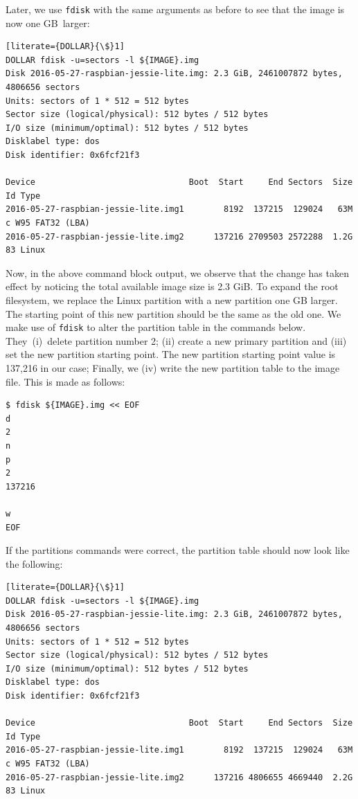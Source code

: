 \documentclass[electronics,article,accept,moreauthors,pdftex,10pt,a4paper]{mdpi}
\theoremstyle{mdpi}
\newcounter{ex}
\newcounter{re}
\theoremstyle{mdpidefinition}
\begin{document}
Later, we use \texttt{fdisk} with the same arguments as before to see that
the image is now one GB~larger:
\begin{lstlisting}[literate={DOLLAR}{\$}1]
DOLLAR fdisk -u=sectors -l ${IMAGE}.img
Disk 2016-05-27-raspbian-jessie-lite.img: 2.3 GiB, 2461007872 bytes, 4806656 sectors
Units: sectors of 1 * 512 = 512 bytes
Sector size (logical/physical): 512 bytes / 512 bytes
I/O size (minimum/optimal): 512 bytes / 512 bytes
Disklabel type: dos
Disk identifier: 0x6fcf21f3

Device                               Boot  Start     End Sectors  Size Id Type
2016-05-27-raspbian-jessie-lite.img1        8192  137215  129024   63M  c W95 FAT32 (LBA)
2016-05-27-raspbian-jessie-lite.img2      137216 2709503 2572288  1.2G 83 Linux
\end{lstlisting}
\FloatBarrier
\vspace{-5mm}

Now, in the above command block output, we observe that the change has taken
effect by noticing the total available image size is 2.3 GiB. To expand the
root filesystem, we replace the Linux partition with a new partition one GB
larger. The starting point of this new partition should be the same as the old
one. We make use of \texttt{fdisk} to alter the partition table
in the commands below. They~(i)~delete partition number 2; (ii) create a new
primary partition and (iii) set the new partition starting point. The new
partition starting point value is 137,216 in our case; Finally, we (iv) write
the new partition table to the image file. This is made as follows:
\newpage
\begin{lstlisting}[]
$ fdisk ${IMAGE}.img << EOF
d
2
n
p
2
137216

w
EOF
\end{lstlisting}
\FloatBarrier
\vspace{-5mm}

If the partitions commands were correct, the partition table should now
look like the following:
\begin{lstlisting}[literate={DOLLAR}{\$}1]
DOLLAR fdisk -u=sectors -l ${IMAGE}.img
Disk 2016-05-27-raspbian-jessie-lite.img: 2.3 GiB, 2461007872 bytes, 4806656 sectors
Units: sectors of 1 * 512 = 512 bytes
Sector size (logical/physical): 512 bytes / 512 bytes
I/O size (minimum/optimal): 512 bytes / 512 bytes
Disklabel type: dos
Disk identifier: 0x6fcf21f3

Device                               Boot  Start     End Sectors  Size Id Type
2016-05-27-raspbian-jessie-lite.img1        8192  137215  129024   63M  c W95 FAT32 (LBA)
2016-05-27-raspbian-jessie-lite.img2      137216 4806655 4669440  2.2G 83 Linux
\end{lstlisting}
\FloatBarrier
\vspace{-5mm}
\end{document}
